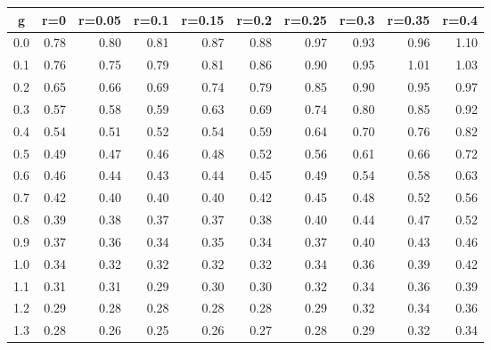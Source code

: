 %
\begin{table}[!tbp]
 \begin{center}
 \begin{tabular}{rrrrrrrrrr}\hline\hline
\multicolumn{1}{c}{g}&\multicolumn{1}{c}{r=0}&\multicolumn{1}{c}{r=0.05}&\multicolumn{1}{c}{r=0.1}&\multicolumn{1}{c}{r=0.15}&\multicolumn{1}{c}{r=0.2}&\multicolumn{1}{c}{r=0.25}&\multicolumn{1}{c}{r=0.3}&\multicolumn{1}{c}{r=0.35}&\multicolumn{1}{c}{r=0.4}\tabularnewline
\hline
0.0&0.78&0.80&0.81&0.87&0.88&0.97&0.93&0.96&1.10\tabularnewline
0.1&0.76&0.75&0.79&0.81&0.86&0.90&0.95&1.01&1.03\tabularnewline
0.2&0.65&0.66&0.69&0.74&0.79&0.85&0.90&0.95&0.97\tabularnewline
0.3&0.57&0.58&0.59&0.63&0.69&0.74&0.80&0.85&0.92\tabularnewline
0.4&0.54&0.51&0.52&0.54&0.59&0.64&0.70&0.76&0.82\tabularnewline
0.5&0.49&0.47&0.46&0.48&0.52&0.56&0.61&0.66&0.72\tabularnewline
0.6&0.46&0.44&0.43&0.44&0.45&0.49&0.54&0.58&0.63\tabularnewline
0.7&0.42&0.40&0.40&0.40&0.42&0.45&0.48&0.52&0.56\tabularnewline
0.8&0.39&0.38&0.37&0.37&0.38&0.40&0.44&0.47&0.52\tabularnewline
0.9&0.37&0.36&0.34&0.35&0.34&0.37&0.40&0.43&0.46\tabularnewline
1.0&0.34&0.32&0.32&0.32&0.32&0.34&0.36&0.39&0.42\tabularnewline
1.1&0.31&0.31&0.29&0.30&0.30&0.32&0.34&0.36&0.39\tabularnewline
1.2&0.29&0.28&0.28&0.28&0.28&0.29&0.32&0.34&0.36\tabularnewline
1.3&0.28&0.26&0.25&0.26&0.27&0.28&0.29&0.32&0.34\tabularnewline
\hline
\end{tabular}

\end{center}

\end{table}

